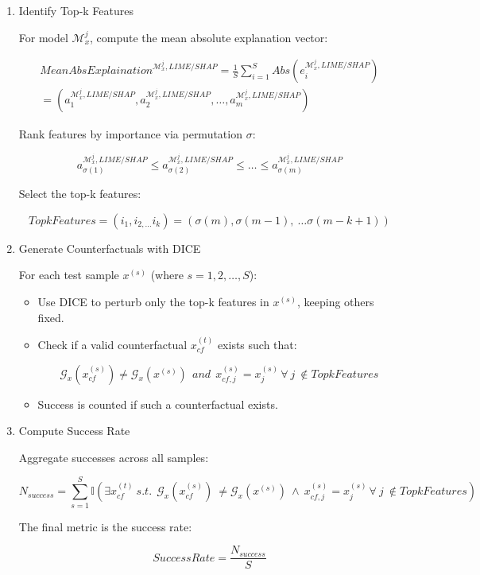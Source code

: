 \documentclass{article}
\begin{document}
\begin{enumerate}
    \item Identify Top-k Features
    
    For model $\mathcal{M}_{x}^{j}$, compute the mean absolute explanation vector:
    
\begin{align}
    {MeanAbsExplaination}^{\mathcal{M}_{x}^{j},LIME/SHAP} = \frac{1}{S}\sum_{i = 1}^{S}{Abs(e_{i}^{\mathcal{M}_{x}^{j},LIME/SHAP})} \nonumber \\= (a_{1}^{\mathcal{M}_{x}^{j},LIME/SHAP},a_{2}^{\mathcal{M}_{x}^{j},LIME/SHAP},\ldots,a_{m}^{\mathcal{M}_{x}^{j},LIME/SHAP})\nonumber
\end{align}
    
    
    Rank features by importance via permutation $\sigma$:
    
    $$a_{\sigma(1)}^{\mathcal{M}_{x}^{j},LIME/SHAP} \leq a_{\sigma(2)}^{\mathcal{M}_{x}^{j},LIME/SHAP} \leq \ldots \leq a_{\sigma(m)}^{\mathcal{M}_{x}^{j},LIME/SHAP}$$
    
    Select the top-k features:
    
    $$TopkFeatures = \left( i_{1},i_{2,\ldots}i_{k} \right) = (\sigma(m),\sigma(m - 1),\ \ldots\sigma(m - k + 1))$$
    
    \item Generate Counterfactuals with DICE
    
    For each test sample $x^{(s)}$ (where $s = 1,2,\ldots,S$):
    
    \begin{itemize}
        \item Use DICE to perturb only the top-k features in $x^{(s)}$, keeping others fixed.
        \item Check if a valid counterfactual $x_{cf}^{(t)}$ exists such that:
        
        $$\mathcal{G}_{x}\left( x_{cf}^{(s)} \right) \neq \mathcal{G}_{x}\left( x^{(s)} \right)\ \ and\ \ x_{cf,j}^{(s)} = x_{j}^{(s)\ }\forall\ j\  \notin TopkFeatures$$
        
        \item Success is counted if such a counterfactual exists.
    \end{itemize}
    
    \item Compute Success Rate
    
    Aggregate successes across all samples:

        $$N_{success} = \sum_{s = 1}^{S}{\mathbb{I}(\exists x_{cf}^{(t)}\ s.t.\ \ \mathcal{G}_{x}(x_{cf}^{(s)})\  \neq \mathcal{G}_{x}\left( x^{(s)} \right)\  \land \ x_{cf,j}^{(s)} = x_{j}^{(s)\ } \forall\ j\ \notin TopkFeatures)}$$
    
    The final metric is the success rate:
    
    $$SuccessRate = \frac{N_{success}}{S}$$
    
\end{enumerate}
\end{document}
